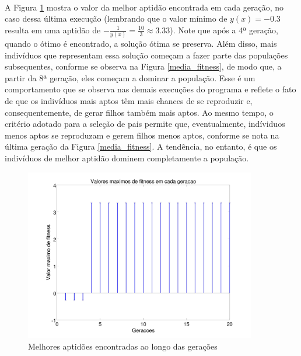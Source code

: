 \documentclass{report}
\begin{document}
	\paragraph{} A Figura \ref{melhores_fitness} mostra o valor da melhor aptidão encontrada em cada geração, no caso dessa última execução (lembrando que o valor mínimo de $y(x) = -0.3$ resulta em uma aptidão de $-\frac{1}{y(x)} = \frac{10}{3} \approx 3.33$). Note que após a 4ª geração, quando o ótimo é encontrado, a solução ótima se preserva. Além disso, mais indivíduos que representam essa solução começam a fazer parte das populações subsequentes, conforme se observa na Figura \ref{media_fitness}, de modo que, a partir da 8ª geração, eles começam a dominar a população. Esse é um comportamento que se observa nas demais execuções do programa e reflete o fato de que os indivíduos mais aptos têm mais chances de se reproduzir e, consequentemente, de gerar filhos também mais aptos. Ao mesmo tempo, o critério adotado para a seleção de pais permite que, eventualmente, indíviduos menos aptos se reproduzam e gerem filhos menos aptos, conforme se nota na última geração da Figura \ref{media_fitness}. A tendência, no entanto, é que os indivíduos de melhor aptidão dominem completamente a população.\\
	
	\begin{figure}[H]
		\includegraphics[width=0.9\textwidth]{Q01_melhores_fitness.jpg}
		\caption{Melhores aptidões encontradas ao longo das gerações}
		\label{melhores_fitness}
	\end{figure}
	
\end{document}
